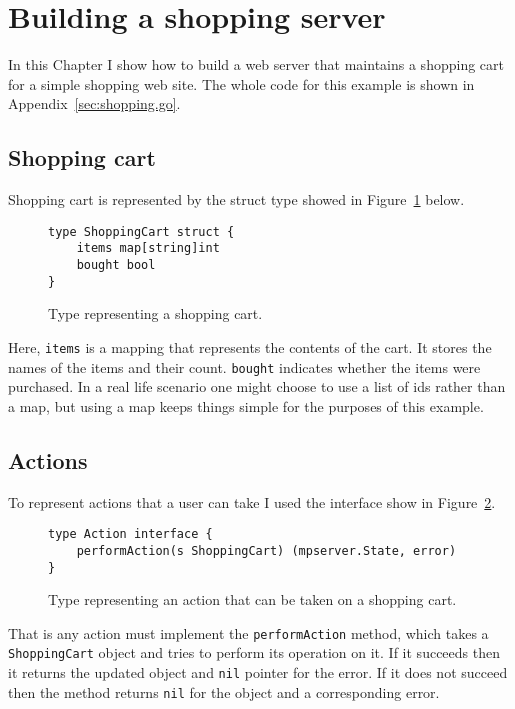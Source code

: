 \section{Building a shopping server}
\label{sec:shopping}
In this Chapter I show how to build a web server that
maintains a shopping cart for a simple shopping web site. The whole 
code for this example is shown in Appendix~\ref{sec:shopping.go}.

\subsection{Shopping cart}
Shopping cart is represented by the struct type showed in 
Figure~\ref{fig:shoppingCart} below.
\begin{figure}[h]
\begin{lstlisting}
type ShoppingCart struct {
    items map[string]int
    bought bool
}
\end{lstlisting}
\caption[scale=1.0]{Type representing a shopping cart.}
\label{fig:shoppingCart}
\end{figure}

Here, \texttt{items} is 
a mapping that represents the contents of the cart. It stores the names
of the items and their count. \texttt{bought} indicates whether the items
were purchased. In a real life scenario one might choose to use 
a list of ids rather than a map, but using a map keeps things simple
for the purposes of this example.

\subsection{Actions}
To represent actions that a user can take I used the interface show in 
Figure~\ref{fig:action}.
\begin{figure}[h]
\begin{lstlisting}
type Action interface {
    performAction(s ShoppingCart) (mpserver.State, error)
}
\end{lstlisting}
\caption[scale=1.0]{Type representing an action that can be taken on 
a shopping cart.}
\label{fig:action}
\end{figure}

That is any action must implement the \texttt{performAction} method, which takes
a \texttt{ShoppingCart} object and tries to perform its operation on it. If
it succeeds then it returns the updated object and \texttt{nil} pointer for the
error. If it does not succeed then the method returns \texttt{nil} for the
object and a corresponding error.

